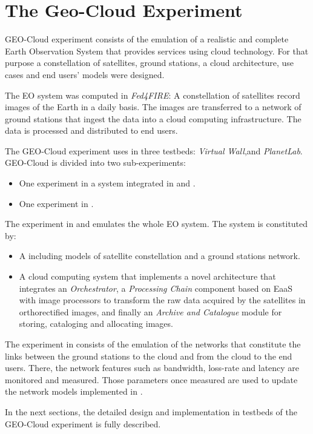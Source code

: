 
\chapter{The Geo-Cloud Experiment}
\label{chap:geocloud-experiment}
 GEO-Cloud experiment consists of the emulation of a realistic and complete Earth Observation System that provides services using cloud technology. For that purpose a constellation of satellites, ground stations, a cloud architecture, use cases and end users' models were designed.

The \ac{EO} system was computed in \emph{Fed4FIRE}: A constellation of
satellites record images of the Earth in a daily basis. The images are
transferred to a network of ground stations that ingest the data into a cloud computing infrastructure. The data is processed and distributed to end users.

The GEO-Cloud experiment uses in three testbeds: \emph{Virtual Wall},\bonfire and
\emph{PlanetLab}. GEO-Cloud is divided into two sub-experiments:
\begin{itemize}
\item One experiment in a system integrated in \vw and \bonfire.
\item One experiment in \pl.
\end{itemize}

The experiment in \vw and \bonfire emulates the whole \ac{EO} system. The system is constituted by:

\begin{itemize}
\item A \sss including models of satellite constellation and a ground stations
  network.
\item A cloud computing system that implements a novel architecture that
  integrates an \emph{Orchestrator}, a \emph{Processing Chain} component
  based on \ac{EaaS}  with image processors to transform the raw data acquired
  by the satellites in orthorectified images, and finally an \emph{Archive and Catalogue}
  module for storing, cataloging and allocating images.
\end{itemize}

The experiment in \pl consists of the emulation of the networks that constitute
the links between the ground stations to the cloud and from the cloud to the end
users. There, the network features such as bandwidth, loss-rate and latency are monitored and measured. Those parameters once measured are used to update the
network models implemented in \vw.

In the next sections, the detailed design and implementation in testbeds of the GEO-Cloud experiment is fully
described. 









%

%





